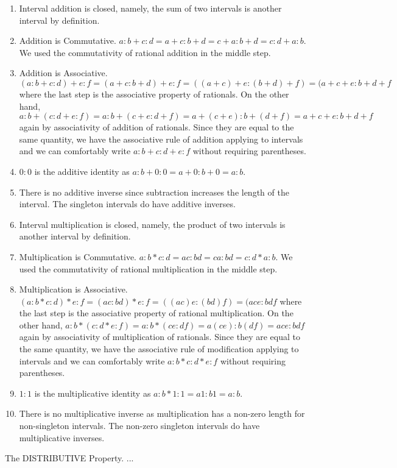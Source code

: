 \documentclass[12pt]{article}
\theoremstyle{remark}
\begin{document}
\begin{enumerate}
    \item Interval addition is closed, namely, the sum of two intervals is another interval by definition. 
    \item Addition is Commutative. $a:b + c:d= a+c : b+d = c+a:b+d = c:d + a:b$. We used the commutativity of rational addition in the middle step. 
    \item Addition is Associative. $(a:b + c:d) + e:f = (a+c:b+d)+e:f = ((a+c)+e:(b+d)+f) = (a+c+e:b+d+f$ where the last step is the associative property of rationals.  On the other hand, $a:b + (c:d+e:f) = a:b + (c+e:d+f) = a+(c+e):b+(d+f) = a+c+e:b+d+f$ again by associativity of addition of rationals. Since they are equal to the same quantity, we have the associative rule of addition applying to intervals and we can comfortably write $a:b + c:d + e:f$ without requiring parentheses. 
    \item $0:0$ is the additive identity as $a:b+0:0 = a+0:b+0 = a:b$. 
    \item There is no additive inverse since subtraction increases the length of the interval. The singleton intervals do have additive inverses. 
    \item Interval multiplication is closed, namely, the product of two intervals is another interval by definition. 
    \item Multiplication is Commutative. $a:b * c:d= ac : bd = ca:bd = c:d * a:b$. We used the commutativity of rational multiplication in the middle step. 
    \item Multiplication is Associative. $(a:b * c:d) * e:f = (ac:bd)*e:f = ((ac)e:(bd)f) = (ace:bdf$ where the last step is the associative property of rational multiplication.  On the other hand, $a:b * (c:d*e:f) = a:b * (ce:df) = a(ce):b(df) = ace:bdf$ again by associativity of multiplication of rationals. Since they are equal to the same quantity, we have the associative rule of modification applying to intervals and we can comfortably write $a:b * c:d * e:f$ without requiring parentheses.     
    \item $1:1$ is the multiplicative identity as $a:b*1:1 = a1:b1 = a:b$. 
    \item There is no multiplicative inverse as multiplication has a non-zero length for non-singleton intervals. The non-zero singleton intervals do have multiplicative inverses. 
\end{enumerate}

The DISTRIBUTIVE Property. ...
\end{document}
